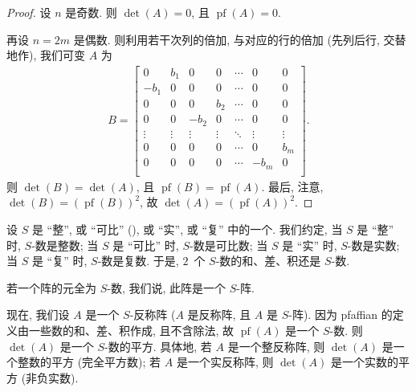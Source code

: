 \documentclass[../libro.tex]{subfiles}
\begin{document}
\begin{proof}
    设 \(n\) 是奇数.
    则 \(\det {(A)} = 0\),
    且 \(\operatorname{pf} {(A)} = 0\).

    再设 \(n = 2m\) 是偶数.
    则利用若干次列的倍加, 与对应的行的倍加
    (先列后行, 交替地作),
    我们可变 \(A\) 为
    \begin{align*}
        B =
        \begin{bmatrix}
            0      & b_1    & 0      & 0      & \cdots & 0      & 0      \\
            -b_1   & 0      & 0      & 0      & \cdots & 0      & 0      \\
            0      & 0      & 0      & b_2    & \cdots & 0      & 0      \\
            0      & 0      & -b_2   & 0      & \cdots & 0      & 0      \\
            \vdots & \vdots & \vdots & \vdots & \ddots & \vdots & \vdots \\
            0      & 0      & 0      & 0      & \cdots & 0      & b_m    \\
            0      & 0      & 0      & 0      & \cdots & -b_m   & 0      \\
        \end{bmatrix}.
    \end{align*}
    则 \(\det {(B)} = \det {(A)}\),
    且 \(\operatorname{pf} {(B)} = \operatorname{pf} {(A)}\).
    最后, 注意, \(\det {(B)}
    = (\operatorname{pf} {(B)})^2\),
    故 \(\det {(A)}
    = (\operatorname{pf} {(A)})^2\).
\end{proof}

\begin{example}
    设 \(S\) 是
    ``整'', 或 ``可比'' (),
    或 ``实'', 或 ``复''
    中的一个.
    我们约定,
    当 \(S\) 是 ``整'' 时, \(S\)-数是整数;
    当 \(S\) 是 ``可比'' 时, \(S\)-数是可比数;
    当 \(S\) 是 ``实'' 时, \(S\)-数是实数;
    当 \(S\) 是 ``复'' 时, \(S\)-数是复数.
    于是, \(2\)~个 \(S\)-数的和、差、积还是 \(S\)-数.

    若一个阵的元全为 \(S\)-数,
    我们说, 此阵是一个 \(S\)-阵.

    现在, 我们设 \(A\) 是一个 \(S\)-反称阵
    (\(A\) 是反称阵, 且 \(A\) 是 \(S\)-阵).
    因为 pfaffian 的定义由一些数的和、差、积作成,
    且不含除法,
    故 \(\operatorname{pf} {(A)}\) 是一个 \(S\)-数.
    则 \(\det {(A)}\) 是一个 \(S\)-数的平方.
    具体地,
    若 \(A\) 是一个整反称阵,
    则 \(\det {(A)}\) 是一个整数的平方 (完全平方数);
    若 \(A\) 是一个实反称阵,
    则 \(\det {(A)}\) 是一个实数的平方 (非负实数).
\end{example}
\end{document}
